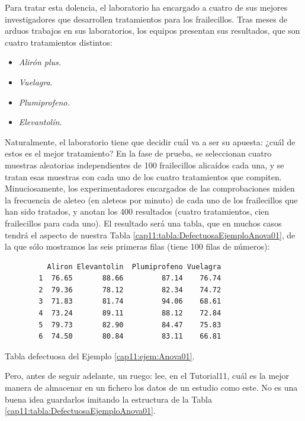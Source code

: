 \begin{ejemplo}
Para tratar esta dolencia, el laboratorio ha encargado a cuatro de sus mejores investigadores que
desarrollen tratamientos para los frailecillos. Tras meses de arduos trabajos en sus laboratorios,
los equipos presentan sus resultados, que son cuatro tratamientos distintos:
\begin{itemize}
  \item {\em Alirón plus.}
  \item {\em Vuelagra.}
  \item {\em Plumiprofeno.}
  \item {\em Elevantolín.}
\end{itemize}
Naturalmente, el laboratorio tiene que decidir cuál va a ser su apuesta: ¿cuál de estos es el mejor tratamiento? En la fase de prueba, se seleccionan cuatro muestras aleatorias independientes de
100 frailecillos alicaídos cada una, y se tratan esas muestras con cada uno de los cuatro tratamientos que compiten. Minuciosamente, los experimentadores encargados de las comprobaciones miden la frecuencia de aleteo (en aleteos por minuto) de cada uno de los frailecillos que han sido tratados, y anotan los 400 resultados (cuatro tratamientos, cien frailecillos para cada uno). El resultado será una tabla, que en muchos casos tendrá el aspecto de nuestra Tabla \ref{cap11:tabla:DefectuosaEjemploAnova01}, de la que sólo mostramos las seis primeras filas (tiene 100 filas de números):
\begin{table}[ht]
\begin{center}
\begin{minipage}{10cm}
\begin{verbatim}
          Aliron Elevantolin  Plumiprofeno Vuelagra
        1  76.65       88.66         87.14    76.74
        2  79.36       78.12         82.34    74.72
        3  71.83       81.74         94.06    68.61
        4  73.24       89.11         88.12    72.84
        5  79.73       82.90         84.47    75.83
        6  74.50       80.84         83.11    66.81
\end{verbatim}
\end{minipage}
\end{center}
\caption{Tabla defectuosa del Ejemplo \ref{cap11:ejem:Anova01}.}
\label{cap11:tabla:DefectuosaEjemploAnova01}
\end{table}
Pero, antes de seguir adelante, un ruego: lee, en el Tutorial11, cuál es la mejor manera de
almacenar en un fichero los datos de un estudio como este. No es una buena idea guardarlos imitando
la estructura de la Tabla \ref{cap11:tabla:DefectuosaEjemploAnova01}.


\end{ejemplo}
